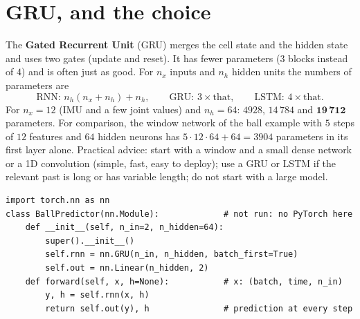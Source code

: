 \section*{GRU, and the choice}
The \textbf{Gated Recurrent Unit} (GRU) merges the cell state and the hidden state and uses two gates (update and reset). It has fewer parameters ($3$ blocks instead of $4$) and is often just as good. For $n_x$ inputs and $n_h$ hidden units the numbers of parameters are
\[
\text{RNN: }n_h(n_x+n_h)+n_h,\qquad\text{GRU: }3\times\text{that},\qquad\text{LSTM: }4\times\text{that}.
\]
For $n_x=12$ (IMU and a few joint values) and $n_h=64$: $4928$, $14\,784$ and $\mathbf{19\,712}$ parameters. For comparison, the window network of the ball example with $5$ steps of $12$ features and $64$ hidden neurons has $5\cdot12\cdot64+64=3904$ parameters in its first layer alone. Practical advice: start with a window and a small dense network or a 1D convolution (simple, fast, easy to deploy); use a GRU or LSTM if the relevant past is long or has variable length; do not start with a large model.
\begin{verbatim}
import torch.nn as nn
class BallPredictor(nn.Module):             # not run: no PyTorch here
    def __init__(self, n_in=2, n_hidden=64):
        super().__init__()
        self.rnn = nn.GRU(n_in, n_hidden, batch_first=True)
        self.out = nn.Linear(n_hidden, 2)
    def forward(self, x, h=None):           # x: (batch, time, n_in)
        y, h = self.rnn(x, h)
        return self.out(y), h               # prediction at every step
\end{verbatim}


